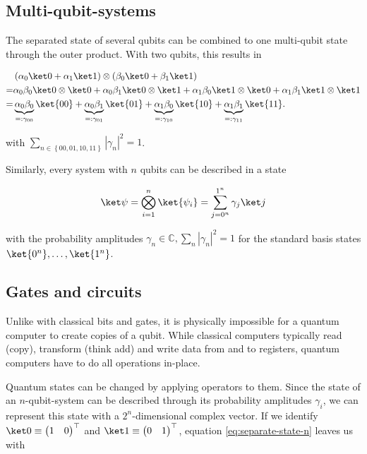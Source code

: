 \subsection{Multi-qubit-systems}
The separated state of several qubits can be combined to one multi-qubit state
through the outer product.
With two qubits, this results in

\begin{equation}
    \label{eq:separate-state}
    \begin{split}
        &\left(\alpha_0 \ket 0 + \alpha_1 \ket 1\right) \otimes \left(\beta_0 \ket 0 + \beta_1 \ket 1\right) \\
        = &\alpha_0\beta_0 \ket 0 \otimes \ket 0 + \alpha_0\beta_1 \ket 0 \otimes \ket 1 + \alpha_1\beta_0 \ket 1 \otimes \ket 0 + \alpha_1\beta_1 \ket 1 \otimes \ket 1 \\
        = &\underbrace{\alpha_0\beta_0}_{=: \gamma_{00}} \ket{00} + \underbrace{\alpha_0\beta_1}_{=: \gamma_{01}} \ket{01} + \underbrace{\alpha_1\beta_0}_{=: \gamma_{10}} \ket{10} + \underbrace{\alpha_1\beta_1}_{=: \gamma_{11}} \ket{11}.
    \end{split}
\end{equation}

with $\sum_{n \in \left\{00, 01, 10, 11\right\}} \left|\gamma_n\right|^2 = 1$.

Similarly, every system with $n$ qubits can be described in a state

\begin{equation}
    \label{eq:separate-state-n}
    \ket\psi = \bigotimes_{i=1}^n \ket{\psi_i} = \sum_{j=0^n}^{1^n} \gamma_j \ket j
\end{equation}

with the probability amplitudes
$\gamma_n \in \mathbb C, \sum_n \left|\gamma_n\right|^2 = 1$ for the standard
basis states $\ket{0^n}, \dots, \ket{1^n}$.

\subsection{Gates and circuits}

Unlike with classical bits and gates, it is physically impossible for a quantum
computer to create copies of a qubit.
While classical computers typically read (copy), transform (think add) and write
data from and to registers, quantum computers have to do all operations
in-place.

Quantum states can be changed by applying operators to them.
Since the state of an $n$-qubit-system can be described through its probability
amplitudes $\gamma_i$, we can represent this state with a $2^n$-dimensional
complex vector.
If we identify $\ket 0 \equiv \begin{pmatrix}1 & 0\end{pmatrix}^\top$ and
$\ket 1 \equiv \begin{pmatrix}0 & 1\end{pmatrix}^\top$,
equation \ref{eq:separate-state-n} leaves us with

